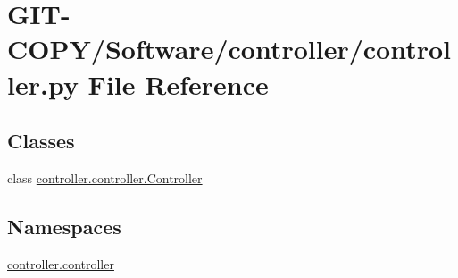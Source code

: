 \hypertarget{GIT-COPY_2Software_2controller_2controller_8py}{}\section{G\+I\+T-\/\+C\+O\+P\+Y/\+Software/controller/controller.py File Reference}
\label{GIT-COPY_2Software_2controller_2controller_8py}
\subsection*{Classes}
\begin{DoxyCompactItemize}
\item 
class \hyperlink{classcontroller_1_1controller_1_1Controller}{controller.\+controller.\+Controller}
\end{DoxyCompactItemize}
\subsection*{Namespaces}
\begin{DoxyCompactItemize}
\item 
 \hyperlink{namespacecontroller_1_1controller}{controller.\+controller}
\end{DoxyCompactItemize}
